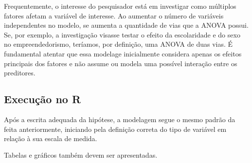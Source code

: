\documentclass[
]{book}
\newenvironment{Shaded}{\begin{snugshade}}{\end{snugshade}}
\newcommand{\DataTypeTok}[1]{\textcolor[rgb]{0.13,0.29,0.53}{#1}}
\newcommand{\DecValTok}[1]{\textcolor[rgb]{0.00,0.00,0.81}{#1}}
\newcommand{\KeywordTok}[1]{\textcolor[rgb]{0.13,0.29,0.53}{\textbf{#1}}}
\newcommand{\NormalTok}[1]{#1}
\newcommand{\OperatorTok}[1]{\textcolor[rgb]{0.81,0.36,0.00}{\textbf{#1}}}
\newcommand{\StringTok}[1]{\textcolor[rgb]{0.31,0.60,0.02}{#1}}
\begin{document}
Frequentemente, o interesse do pesquisador está em investigar como múltiplos fatores afetam a variável de interesse. Ao aumentar o número de variáveis independentes no modelo, se aumenta a quantidade de vias que a ANOVA possui. Se, por exemplo, a investigação visasse testar o efeito da escolaridade e do sexo no empreendedorismo, teríamos, por definição, uma ANOVA de duas vias. É fundamental atentar que essa modelage inicialmente considera apenas os efeitos principais dos fatores e não assume ou modela uma possível interação entre os preditores.

\hypertarget{execuuxe7uxe3o-no-r-2}{%
\subsection{Execução no R}\label{execuuxe7uxe3o-no-r-2}}

Após a escrita adequada da hipótese, a modelagem segue o mesmo padrão da feita anteriormente, iniciando pela definição correta do tipo de variável em relação à sua escala de medida.

\begin{Shaded}
\end{Shaded}

Tabelas e gráficos também devem ser apresentadas.
\end{document}
